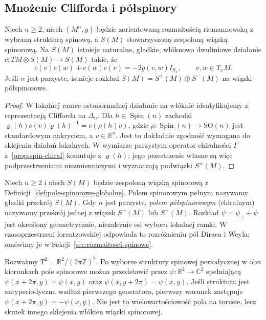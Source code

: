 \subsection{Mnożenie Clifforda i półspinory}

\begin{stwierdzenie}
\label{prop:pola-spinorowe-clifford}
Niech $n\geq2$, niech $(M^n,g)$ będzie zorientowaną
rozmaitością riemannowską z wybraną strukturą spinową,
a $S(M)$ stowarzyszoną zespoloną wiązką spinorową.
Na $S(M)$ istnieje naturalne, gładkie, włóknowo dwuliniowe
działanie $c:TM\otimes S(M)\to S(M)$ takie, że
\begin{equation}\label{eq:pola-spinorowe-clifford}
 c(v)c(w)+c(w)c(v)=-2g(v,w)I_{S_x},
 \qquad v,w\in T_xM.
\end{equation}
Jeśli $n$ jest parzyste, istnieje rozkład
$S(M)=S^+(M)\oplus S^-(M)$ na wiązki półspinorowe.
\end{stwierdzenie}
\begin{proof}
W lokalnej ramce ortonormalnej działanie na włóknie
identyfikujemy z reprezentacją Clifforda na $\Delta_n$.
Dla $h\in\operatorname{Spin}(n)$ zachodzi
$\varrho(h)c(v)\varrho(h)^{-1}=c(\rho(h)v)$,
gdzie $\rho:\operatorname{Spin}(n)\to\mathrm{SO}(n)$
jest standardowym nakryciem, a $v\in\mathbb R^n$.
Jest to dokładnie zgodność wymagana do sklejenia
działań lokalnych. W wymiarze parzystym operator
chiralności $\Gamma$ z~\ref{prop:spin-chiral} komutuje
z $\varrho(h)$; jego przestrzenie własne są więc
podprzestrzeniami niezmienniczymi i wyznaczają
podwiązki $S^\pm(M)$.
\end{proof}

\begin{definicja}
\label{def:pola-spinorowe-dirac-weyl}
Niech $n\geq2$ i niech $S(M)$ będzie zespoloną wiązką
spinorową z Definicji~\ref{def:pole-spinorowe-globalne}.
Polem spinorowym pełnym nazywamy gładki przekrój $S(M)$.
Gdy $n$ jest parzyste, \emph{polem półspinorowym}
(chiralnym) nazywamy przekrój jednej z wiązek
$S^+(M)$ lub $S^-(M)$. Rozkład
$\psi=\psi_++\psi_-$ jest określony geometrycznie,
niezależnie od wyboru lokalnej ramki.
W czasoprzestrzeni lorentzowskiej odpowiada to
rozróżnieniu pól Diraca i Weyla; omówimy je
w Sekcji~\ref{sec:rozmaitosci-spinowe}.
\end{definicja}

\begin{przyklad}
\label{prz:pola-spinorowe-torus}
Rozważmy $T^2=\mathbb R^2/(2\pi\mathbb Z)^2$.
Po wyborze struktury spinowej periodycznej w obu
kierunkach pole spinorowe można przedstawić przez
$\psi:\mathbb R^2\to\mathbb C^2$ spełniającą
$\psi(x+2\pi,y)=\psi(x,y)$ oraz
$\psi(x,y+2\pi)=\psi(x,y)$. Jeśli struktura
jest antyperiodyczna wzdłuż pierwszego generatora,
pierwszy warunek zastępuje
$\psi(x+2\pi,y)=-\psi(x,y)$.
Nie jest to wielowartościowość pola na torusie,
lecz skutek innego sklejenia włókien wiązki spinorowej.
\end{przyklad}

